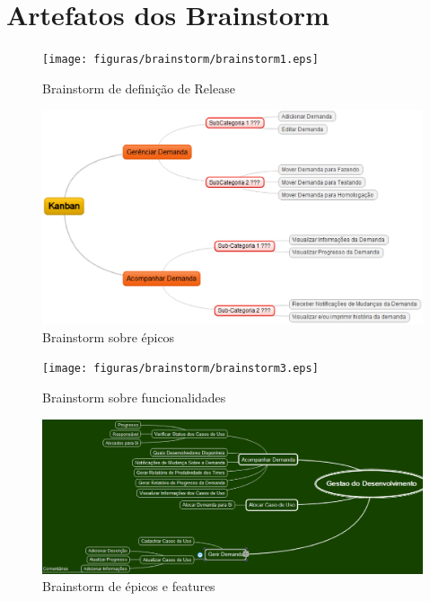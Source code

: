 \chapter[Artefatos dos Brainstorm]{Artefatos dos Brainstorm}

\begin{figure}[H]
	\centering
	\texttt{[image: figuras/brainstorm/brainstorm1.eps]}
	\caption{Brainstorm de definição de Release}
	\label{}
\end{figure}

\begin{figure}[H]
	\centering
	\includegraphics[keepaspectratio=true,scale=0.8]{figuras/brainstorm/brainstorm2.eps}
	\caption{Brainstorm sobre épicos}
	\label{}
\end{figure}

\begin{figure}[H]
	\centering
	\texttt{[image: figuras/brainstorm/brainstorm3.eps]}
	\caption{Brainstorm sobre funcionalidades}
	\label{}
\end{figure}

\begin{figure}[H]
	\centering
	\includegraphics[keepaspectratio=true,scale=0.6]{figuras/brainstorm/brainstorm4.eps}
	\caption{Brainstorm de épicos e features}
	\label{}
\end{figure}

